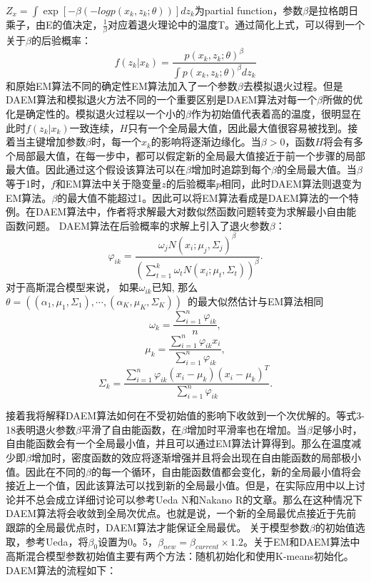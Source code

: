 \documentclass[a4paper,12pt,openany,oneside,utf-8]{ctexbook}
\begin{document}
    $Z_x=\int \exp[-\beta(-logp(x_k,z_k;\theta))]dz_k$为partial function，参数$\beta$是拉格朗日乘子，由E的值决定，$\frac{1}{\beta}$对应着退火理论中的温度T。通过简化上式，可以得到一个关于$\beta$的后验概率：
    \begin{equation}\label{eq4}
        f(z_k|x_k)=\frac{p(x_k,z_k;\theta)^\beta}{\int p(x_k,z_k;\theta)^\beta dz_k}
    \end{equation}
    和原始EM算法不同的确定性EM算法加入了一个参数$\beta$去模拟退火过程。但是DAEM算法和模拟退火方法不同的一个重要区别是DAEM算法对每一个$\beta$所做的优化是确定性的。模拟退火过程以一个小的$\beta$作为初始值代表着高的温度，很明显在此时$f(z_k|x_k)$一致连续，$H$只有一个全局最大值，因此最大值很容易被找到。接着当主键增加参数$\beta$时，每一个$x_k$的影响将逐渐边缘化。当$\beta>0$，函数$H$将会有多个局部最大值，在每一步中，都可以假定新的全局最大值接近于前一个步骤的局部最大值。因此通过这个假设该算法可以在$\beta$增加时追踪到每个$\beta$的全局最大值。当$\beta$等于1时，$f$和EM算法中关于隐变量$z$的后验概率$p$相同，此时DAEM算法则退变为EM算法。$\beta$的最大值不能超过1。因此可以将EM算法看成是DAEM算法的一个特例。在DAEM算法中，作者将求解最大对数似然函数问题转变为求解最小自由能函数问题。 DAEM算法在后验概率的求解上引入了退火参数$\beta$：\begin{equation}\label{eq5}
		\varphi_{i k}=\frac{\omega_j N(x_i;\mu_j,\Sigma_j)^\beta}{(\sum_{t=1}^k\omega_t N(x_i;\mu_t,\Sigma_t))^\beta}.
	\end{equation}
	对于高斯混合模型来说， 如果$\omega_{i k}$已知, 那么~$\theta=\left(\left(\alpha_{1}, \mu_{1}, \Sigma_{1}\right), \cdots,\left(\alpha_{K}, \mu_{K}, \Sigma_{K}\right)\right)$~的最大似然估计与EM算法相同\begin{equation}\label{eq6}
		\omega_{k}=\frac{\sum_{i=1}^{n} \varphi_{i k}}{n},
	\end{equation}\begin{equation}\label{eq7}
		\mu_{k}=\frac{\sum_{i=1}^{n} \varphi_{i k} x_{i}}{\sum_{i=1}^{n} \varphi_{i k}},
	\end{equation}\begin{equation}\label{eq8}
		\Sigma_{k}=\frac{\sum_{i=1}^{n} \varphi_{i k}\left(x_{i}-\mu_{k}\right)\left(x_{i}-\mu_{k}\right)^{T}}{\sum_{i=1}^{n} \varphi_{i k}}.
	\end{equation}
	
	接着我将解释DAEM算法如何在不受初始值的影响下收敛到一个次优解的。等式3-18表明退火参数$\beta$平滑了自由能函数\cite{ref21}，在$\beta$增加时平滑率也在增加。当$\beta$足够小时，自由能函数会有一个全局最小值，并且可以通过EM算法计算得到。那么在温度减少即$\beta$增加时，密度函数的效应将逐渐增强并且将会出现在自由能函数的局部极小值。因此在不同的$\beta$的每一个循环，自由能函数值都会变化，新的全局最小值将会接近上一个值，因此该算法可以找到新的全局最小值。但是，在实际应用中以上讨论并不总会成立详细讨论可以参考Ueda N和Nakano R\cite{ref21}的文章。那么在这种情况下 DAEM算法将会收敛到全局次优点。也就是说，一个新的全局最优点接近于先前跟踪的全局最优点时，DAEM算法才能保证全局最优。
	关于模型参数$\beta$的初始值选取，参考Ueda\cite{ref21}，将$\beta_0$设置为0。5，$\beta_{new}=\beta_{current}\times 1.2$。关于EM和DAEM算法中高斯混合模型参数初始值主要有两个方法：随机初始化和使用K-means初始化。
	DAEM算法的流程如下：
    
\end{document}
